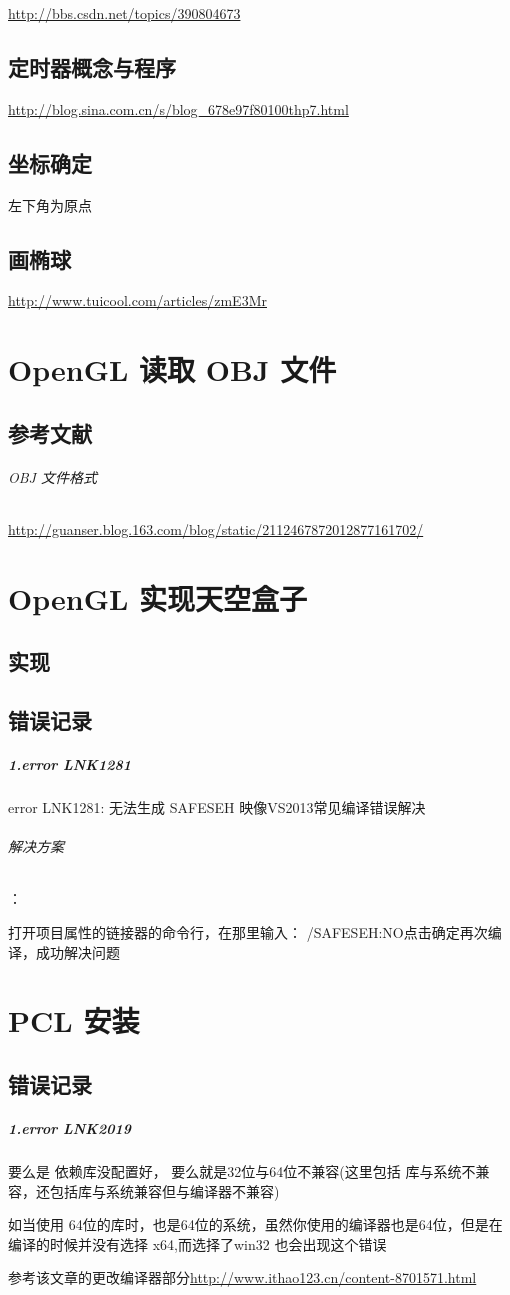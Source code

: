 \documentclass[UTF8,a4paper,12pt]{ctexbook}
\begin{document}
		\url{http://bbs.csdn.net/topics/390804673}
			
	\section{定时器概念与程序}
		\url{http://blog.sina.com.cn/s/blog_678e97f80100thp7.html}
			
			
	\section{坐标确定}
		左下角为原点
		
	\section{画椭球}
		\url{http://www.tuicool.com/articles/zmE3Mr}
		

\chapter{OpenGL 读取 OBJ 文件}
    \section{参考文献} 
		\subparagraph{OBJ 文件格式}\url{http://guanser.blog.163.com/blog/static/2112467872012877161702/}
	
	
 
\chapter{OpenGL 实现天空盒子}
	\section{实现}
		
	\section{错误记录}
		\paragraph{1.error LNK1281}error LNK1281: 无法生成 SAFESEH 映像VS2013常见编译错误解决
		
		\subparagraph{解决方案}：
		
		打开项目属性的链接器的命令行，在那里输入： /SAFESEH:NO点击确定再次编译，成功解决问题


\chapter{PCL  安装}
	\section{错误记录}
		\paragraph{1.error LNK2019} 要么是 依赖库没配置好， 要么就是32位与64位不兼容(这里包括 库与系统不兼容，还包括库与系统兼容但与编译器不兼容)
		
		如当使用 64位的库时，也是64位的系统，虽然你使用的编译器也是64位，但是在编译的时候并没有选择 x64,而选择了win32 也会出现这个错误
		
		参考该文章的更改编译器部分\url{http://www.ithao123.cn/content-8701571.html}
\end{document}

